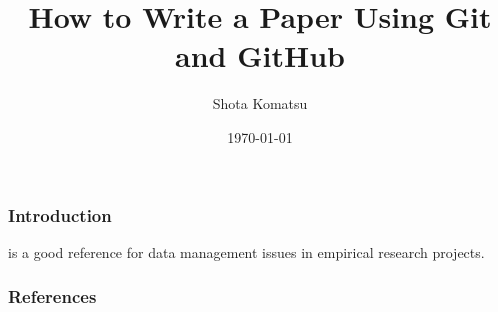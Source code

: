 \documentclass{beamer}
\title{How to Write a Paper Using Git and GitHub}
\author{Shota Komatsu}
\date{\today}
\begin{document}
\frame{\titlepage}

\begin{frame}
\frametitle{Introduction}
\citet{knittel2018working} is a good reference for data management issues in empirical research projects.
\end{frame}

\begin{frame}
\frametitle{References}


    

\end{frame}
\end{document}
